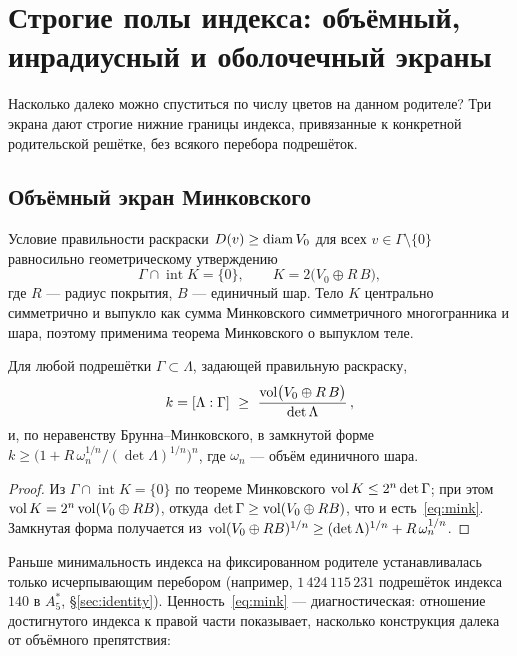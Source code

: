 \section{Строгие полы индекса: объёмный, инрадиусный и оболочечный экраны}
\label{sec:floors}

Насколько далеко можно спуститься по числу цветов на данном родителе? Три
экрана дают строгие нижние границы индекса, привязанные к конкретной
родительской решётке, без всякого перебора подрешёток.

\subsection{Объёмный экран Минковского}\label{ssec:mink}

Условие правильности раскраски $D(v)\ge\operatorname{diam} V_0$ для всех $v\in\Gamma
\setminus\{0\}$ равносильно геометрическому утверждению
\[
\Gamma\cap\operatorname{int}K=\{0\},\qquad K=2\bigl(V_0\oplus R\,B\bigr),
\]
где $R$ --- радиус покрытия, $B$ --- единичный шар. Тело $K$ центрально
симметрично и выпукло как сумма Минковского симметричного многогранника и шара,
поэтому применима теорема Минковского о выпуклом теле.

\begin{proposition}\label{prop:mink}
Для любой подрешётки $\Gamma\subset\Lambda$, задающей правильную
раскраску,
\begin{equation}\label{eq:mink}
k=[\Lambda:\Gamma]\ \ge\ \frac{\operatorname{vol}\bigl(V_0\oplus R\,B\bigr)}{\det\Lambda}\,,
\end{equation}
и, по неравенству Брунна--Минковского, в замкнутой форме
$k\ge\bigl(1+R\,\omega_n^{1/n}/(\det\Lambda)^{1/n}\bigr)^n$, где $\omega_n$ ---
объём единичного шара.
\end{proposition}

\begin{proof}
Из $\Gamma\cap\operatorname{int}K=\{0\}$ по теореме Минковского
$\operatorname{vol} K\le2^n\det\Gamma$; при этом $\operatorname{vol} K=2^n\operatorname{vol}(V_0\oplus RB)$, откуда
$\det\Gamma\ge\operatorname{vol}(V_0\oplus RB)$, что и есть~\eqref{eq:mink}. Замкнутая форма
получается из $\operatorname{vol}(V_0\oplus RB)^{1/n}\ge(\det\Lambda)^{1/n}+R\,\omega_n^{1/n}$.
\end{proof}

Раньше минимальность индекса на фиксированном родителе устанавливалась
только исчерпывающим перебором (например, $1\,424\,115\,231$ подрешёток
индекса $140$ в $A_5^*$, \S\ref{sec:identity}). Ценность~\eqref{eq:mink} ---
диагностическая: отношение достигнутого индекса к правой части показывает,
насколько конструкция далека от объёмного препятствия:

